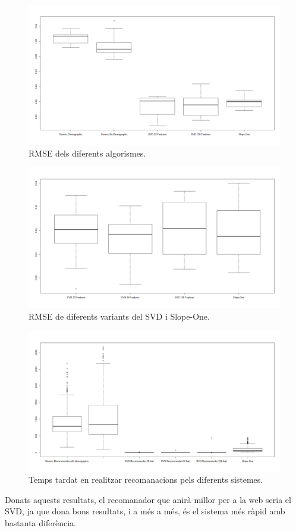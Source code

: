 \begin{figure}[h!]
  \caption{RMSE dels diferents algorismes.}
  \label{figure-rmse-scores}
  \centering
    \includegraphics[width=\textwidth]{figs/resultats_10iter.png}
\end{figure}

\begin{figure}[h!]
  \caption{RMSE de diferents variants del SVD i Slope-One.}
  \label{figure-rmse-scores-specific}
  \centering
    \includegraphics[width=\textwidth]{figs/resultats_20iter_specific.png}
\end{figure}

\begin{figure}[h!]
  \caption{Temps tardat en realitzar recomanacions pels diferents sistemes.}
  \label{figure-recommender-speed}
  \centering
    \includegraphics[width=\textwidth]{figs/times.png}
\end{figure}

Donats aquests resultats, el recomanador que anirà millor per a la web seria el SVD, ja que dona bons resultats, i a més a més, és el sistema més ràpid amb bastanta diferència.
